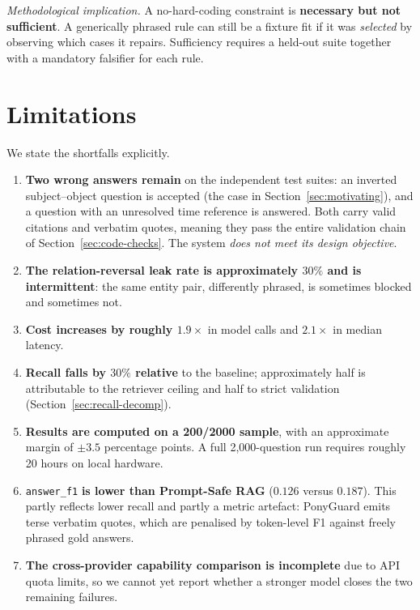 \documentclass[conference]{IEEEtran}
\begin{document}
\emph{Methodological implication.} A no-hard-coding constraint is \textbf{necessary
but not sufficient}. A generically phrased rule can still be a fixture fit if it
was \emph{selected} by observing which cases it repairs. Sufficiency requires a
held-out suite together with a mandatory falsifier for each rule.

\section{Limitations}
\label{sec:limitations}

We state the shortfalls explicitly.

\begin{enumerate}
  \item \textbf{Two wrong answers remain} on the independent test suites: an
        inverted subject--object question is accepted (the case in
        Section~\ref{sec:motivating}), and a question with an unresolved time
        reference is answered. Both carry valid citations and verbatim quotes,
        meaning they pass the entire validation chain of
        Section~\ref{sec:code-checks}. The system \emph{does not meet its design
        objective}.
  \item \textbf{The relation-reversal leak rate is approximately $30\%$ and is
        intermittent}: the same entity pair, differently phrased, is sometimes
        blocked and sometimes not.
  \item \textbf{Cost increases by roughly $1.9\times$} in model calls and
        $2.1\times$ in median latency.
  \item \textbf{Recall falls by $30\%$ relative} to the baseline; approximately
        half is attributable to the retriever ceiling and half to strict
        validation (Section~\ref{sec:recall-decomp}).
  \item \textbf{Results are computed on a 200/2000 sample}, with an approximate
        margin of $\pm 3.5$ percentage points. A full 2{,}000-question run
        requires roughly 20 hours on local hardware.
  \item \texttt{answer\_f1} \textbf{is lower than Prompt-Safe RAG} ($0.126$ versus
        $0.187$). This partly reflects lower recall and partly a metric artefact:
        PonyGuard emits terse verbatim quotes, which are penalised by token-level
        F1 against freely phrased gold answers.
  \item \textbf{The cross-provider capability comparison is incomplete} due to API
        quota limits, so we cannot yet report whether a stronger model closes the
        two remaining failures.
\end{enumerate}
\end{document}
